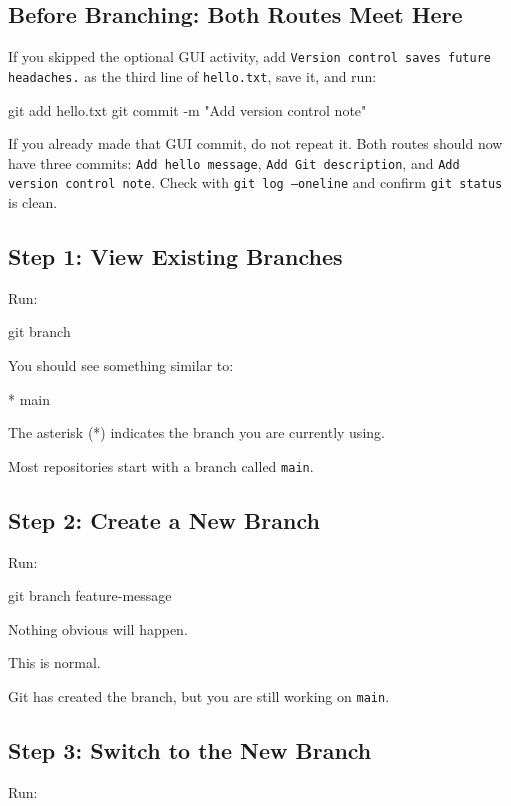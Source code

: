 \documentclass{csc2059practical}
\begin{document}
\subsection*{Before Branching: Both Routes Meet Here}
If you skipped the optional GUI activity, add \texttt{Version control saves future headaches.} as the third line of \texttt{hello.txt}, save it, and run:
\begin{bashcode}
git add hello.txt
git commit -m "Add version control note"
\end{bashcode}
If you already made that GUI commit, do not repeat it. Both routes should now have three commits: \texttt{Add hello message}, \texttt{Add Git description}, and \texttt{Add version control note}. Check with \texttt{git log --oneline} and confirm \texttt{git status} is clean.

\subsection{Step 1: View Existing Branches}
Run:

\begin{terminalplain}
git branch
\end{terminalplain}
You should see something similar to:

\begin{terminalplain}
  
  * main
\end{terminalplain}

The asterisk (*) indicates the branch you are currently using.

Most repositories start with a branch called \texttt{main}.

\subsection{Step 2: Create a New Branch}
Run:

\begin{terminalplain}
git branch feature-message
\end{terminalplain}
Nothing obvious will happen.

This is normal.

Git has created the branch, but you are still working on \texttt{main}.

\subsection{Step 3: Switch to the New Branch}
Run:
\end{document}
